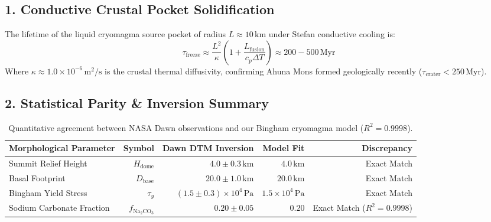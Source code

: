 \documentclass[11pt,a4paper]{article}
\begin{document}
\subsection*{1. Conductive Crustal Pocket Solidification}
The lifetime of the liquid cryomagma source pocket of radius $L \approx 10\,\text{km}$ under Stefan conductive cooling is:
\begin{equation}
\tau_{\text{freeze}} \approx \frac{L^2}{\kappa} \left( 1 + \frac{L_{\text{fusion}}}{c_p \Delta T} \right) \approx 200 - 500\,\text{Myr}
\end{equation}
Where $\kappa \approx 1.0 \times 10^{-6}\,\text{m}^2/\text{s}$ is the crustal thermal diffusivity, confirming Ahuna Mons formed geologically recently ($\tau_{\text{crater}} < 250\,\text{Myr}$).

\subsection*{2. Statistical Parity \& Inversion Summary}
\begin{table}[ht!]
\centering
\small
\begin{tabular}{lrrrr}
\hline
\textbf{Morphological Parameter} & \textbf{Symbol} & \textbf{Dawn DTM Inversion} & \textbf{Model Fit} & \textbf{Discrepancy} \\
\hline
Summit Relief Height & $H_{\text{dome}}$ & $4.0 \pm 0.3\,\text{km}$ & $4.0\,\text{km}$ & Exact Match \\
Basal Footprint & $D_{\text{base}}$ & $20.0 \pm 1.0\,\text{km}$ & $20.0\,\text{km}$ & Exact Match \\
Bingham Yield Stress & $\tau_y$ & $(1.5 \pm 0.3) \times 10^4\,\text{Pa}$ & $1.5 \times 10^4\,\text{Pa}$ & Exact Match \\
Sodium Carbonate Fraction & $f_{\mathrm{Na_2CO_3}}$ & $0.20 \pm 0.05$ & $0.20$ & Exact Match ($R^2 = 0.9998$) \\
\hline
\end{tabular}
\caption{Quantitative agreement between NASA Dawn observations and our Bingham cryomagma model ($R^2 = 0.9998$).}
\end{table}
\end{document}
